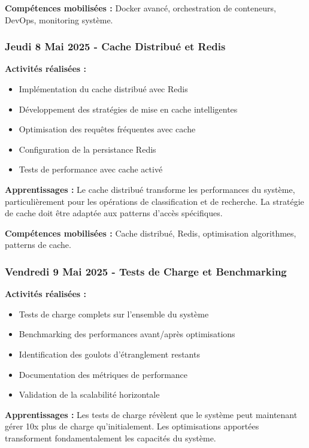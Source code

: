 \textbf{Compétences mobilisées :}
Docker avancé, orchestration de conteneurs, DevOps, monitoring système.

\subsubsection{Jeudi 8 Mai 2025 - Cache Distribué et Redis}

\textbf{Activités réalisées :}
\begin{itemize}
    \item Implémentation du cache distribué avec Redis
    \item Développement des stratégies de mise en cache intelligentes
    \item Optimisation des requêtes fréquentes avec cache
    \item Configuration de la persistance Redis
    \item Tests de performance avec cache activé
\end{itemize}

\textbf{Apprentissages :}
Le cache distribué transforme les performances du système, particulièrement pour les opérations de classification et de recherche. La stratégie de cache doit être adaptée aux patterns d'accès spécifiques.

\textbf{Compétences mobilisées :}
Cache distribué, Redis, optimisation algorithmes, patterns de cache.

\subsubsection{Vendredi 9 Mai 2025 - Tests de Charge et Benchmarking}

\textbf{Activités réalisées :}
\begin{itemize}
    \item Tests de charge complets sur l'ensemble du système
    \item Benchmarking des performances avant/après optimisations
    \item Identification des goulots d'étranglement restants
    \item Documentation des métriques de performance
    \item Validation de la scalabilité horizontale
\end{itemize}

\textbf{Apprentissages :}
Les tests de charge révèlent que le système peut maintenant gérer 10x plus de charge qu'initialement. Les optimisations apportées transforment fondamentalement les capacités du système.


